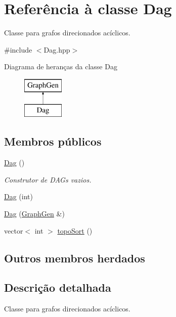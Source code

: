 \hypertarget{classDag}{}\section{Referência à classe Dag}
\label{classDag}


Classe para grafos direcionados acíclicos.  




{\ttfamily \#include $<$Dag.\+hpp$>$}

Diagrama de heranças da classe Dag\begin{figure}[H]
\begin{center}
\leavevmode
\includegraphics[height=2.000000cm]{classDag}
\end{center}
\end{figure}
\subsection*{Membros públicos}
\begin{DoxyCompactItemize}
\item 
\mbox{\label{classDag_a9389de85348f50a4cad1681d5d573e12}} 
\mbox{\hyperlink{classDag_a9389de85348f50a4cad1681d5d573e12}{Dag}} ()
\begin{DoxyCompactList}\small\item\em Construtor de D\+A\+Gs vazios. \end{DoxyCompactList}\item 
\mbox{\hyperlink{classDag_a60039050421d45ed24d5fff16dd0b4d9}{Dag}} (int)
\item 
\mbox{\hyperlink{classDag_a7ac03b3c8b13d4a85956eec57a1b8cd3}{Dag}} (\mbox{\hyperlink{classGraphGen}{Graph\+Gen}} \&)
\item 
vector$<$ int $>$ \mbox{\hyperlink{classDag_ac2f36e91443cfeea16640a81865110d2}{topo\+Sort}} ()
\end{DoxyCompactItemize}
\subsection*{Outros membros herdados}


\subsection{Descrição detalhada}
Classe para grafos direcionados acíclicos. 

